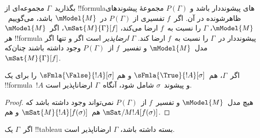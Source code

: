 \documentclass[../../../include/open-logic-section]{subfiles}
\begin{document}
\begin{defn}
  بگذارید~$\Gamma$ مجموعه‌ای از !!{formula}های پیشونددار باشد و
  $P(\Gamma)$ مجموعهٔ پیشوندهای ظاهرشونده در آن. اگر~$f$ تفسیری از
  $P(\Gamma)$ در~$\mModel{M}$ باشد، می‌گوییم~$\mModel{M}$، $\Gamma$
  را نسبت به~$f$ ارضا می‌کند، $\mSat{M}{\Gamma}[f]$، اگر~$\mModel{M}$
  هر !!{formula} پیشونددار در~$\Gamma$ را نسبت به~$f$ ارضا کند.
  $\Gamma$ \emph{ارضاپذیر} است اگر و تنها اگر مدل~$\mModel{M}$ و
  تفسیر~$f$ از~$P(\Gamma)$ وجود داشته باشند چنان‌که
  $\mSat{M}{\Gamma}[f]$.
\end{defn}

\begin{prop}
  اگر~$\Gamma$، هم~$\sFmla{\True}{!A}[\sigma]$ و هم
  $\sFmla{\False}{!A}[\sigma]$ را برای یک !!{formula}~$!A$ و
  پیشوند~$\sigma$ شامل شود، آنگاه~$\Gamma$ ارضاناپذیر است.
\end{prop}

\begin{proof}
  هیچ مدل~$\mModel{M}$ و تفسیر~$f$ از~$P(\Gamma)$ نمی‌تواند وجود
  داشته باشد که هم~$\mSat{M}{!A}[f(\sigma)]$ و هم
  $\mSat/{M}{!A}[f(\sigma)]$.
\end{proof}

\begin{thm}[درستی]
  اگر~$\Gamma$ یک !!{tableau} بسته داشته باشد، $\Gamma$ ارضاناپذیر است.
\end{thm}
\end{document}
